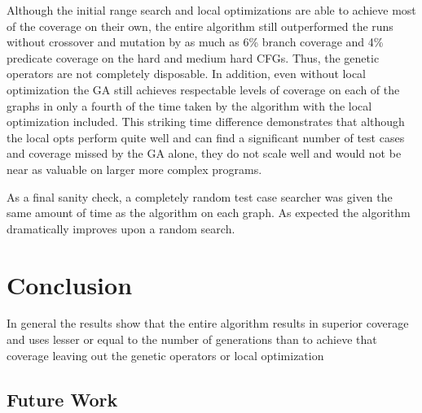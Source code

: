 \documentclass[runningheads]{llncs}
\begin{document}
Although the initial range search and local optimizations are able to achieve most of the coverage on their own, the entire algorithm still outperformed the runs without crossover and mutation by as much as 6\% branch coverage and 4\% predicate coverage on the hard and medium hard CFGs. Thus, the genetic operators are not completely disposable. In addition, even without local optimization the GA still achieves respectable levels of coverage on each of the graphs in only a fourth of the time taken by the algorithm with the local optimization included. This striking time difference demonstrates that although the local opts perform quite well and can find a significant number of test cases and coverage missed by the GA alone, they do not scale well and would not be near as valuable on larger more complex programs. 

As a final sanity check, a completely random test case searcher was given the same amount of time as the algorithm on each graph. As expected the algorithm dramatically improves upon a random search.
 

\newpage
\section{Conclusion}


In general the results show that the entire algorithm results in superior coverage and uses lesser or equal to the number of generations than to achieve that coverage leaving out the genetic operators or local optimization

\subsection{Future Work}
\end{document}
